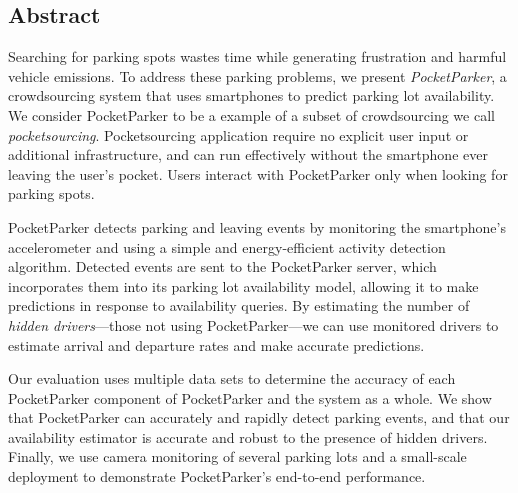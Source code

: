\subsection*{Abstract}

Searching for parking spots wastes time while generating frustration and
harmful vehicle emissions. To address these parking problems, we present
\textit{PocketParker}, a crowdsourcing system that uses smartphones to
predict parking lot availability. We consider PocketParker to be a example of
a subset of crowdsourcing we call \textit{pocketsourcing}. Pocketsourcing
application require no explicit user input or additional infrastructure, and
can run effectively without the smartphone ever leaving the user's pocket.
Users interact with PocketParker only when looking for parking spots.

PocketParker detects parking and leaving events by monitoring the
smartphone's accelerometer and using a simple and energy-efficient activity
detection algorithm. Detected events are sent to the PocketParker server,
which incorporates them into its parking lot availability model, allowing it
to make predictions in response to availability queries. By estimating the
number of \textit{hidden drivers}---those not using PocketParker---we can use
monitored drivers to estimate arrival and departure rates and make accurate
predictions.

Our evaluation uses multiple data sets to determine the accuracy of each
PocketParker component of PocketParker and the system as a whole. We show
that PocketParker can accurately and rapidly detect parking events, and that
our availability estimator is accurate and robust to the presence of hidden
drivers. Finally, we use camera monitoring of several parking lots and a
small-scale deployment to demonstrate PocketParker's end-to-end performance. 
